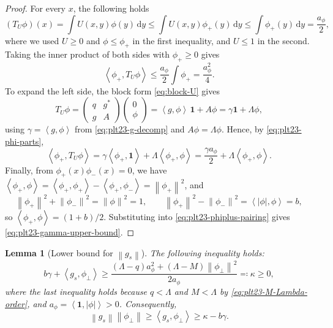 ﻿\documentclass[11pt]{article}
\newtheorem{lemma}[theorem]{Lemma}
\numberwithin{equation}{section}
\newcommand{\one}{\mathbf 1}
\newcommand{\ip}[2]{\left\langle #1,#2\right\rangle}
\newcommand{\norm}[1]{\left\lVert #1\right\rVert}
\newcommand{\dd}{\,\mathrm d}
\begin{document}
\begin{proof}
  For every $x$, the following holds
  \[
    (T_U \phi)(x) = \int U(x, y) \phi(y) \dd y \le \int U(x, y) \phi_+(y) \dd y \le \int \phi_+(y) \dd y = \frac{a_\phi}{2},
  \]
  where we used $U \ge 0$ and $\phi \le \phi_+$ in the first inequality, and $U \le 1$ in the second.
  Taking the inner product of both sides with $\phi_+\ge0$ gives
  \begin{equation}\label{eq:plt23-phiplus-pairing}
    \ip{\phi_+}{T_U\phi}
    \le\frac{a_\phi}{2}\int\phi_+
    =\frac{a_\phi^2}{4}.
  \end{equation}
  To expand the left side, the block form \eqref{eq:block-U} gives
  \[
    T_U\phi=\begin{pmatrix}
      q & g^* \\
      g & A
    \end{pmatrix} \begin{pmatrix}
      0 \\ \phi
    \end{pmatrix}=\ip g\phi\,\one+A\phi=\gamma\one+\Lambda\phi,
  \]
  using $\gamma=\ip g\phi$ from \eqref{eq:plt23-g-decomp} and $A\phi=\Lambda\phi$.
  Hence, by \eqref{eq:plt23-phi-parts},
  \[
    \ip{\phi_+}{T_U\phi}
    =\gamma\ip{\phi_+}\one+\Lambda\ip{\phi_+}\phi
    =\frac{\gamma a_\phi}{2}+\Lambda\ip{\phi_+}\phi.
  \]
  Finally, from $\phi_+(x) \phi_-(x) = 0$, we have $\ip{\phi_+}\phi=\ip{\phi_+}{\phi_+} - \ip{\phi_+}{\phi_-} = \norm{\phi_+}^2$, and
  \[
    \norm{\phi_+}^2+\norm{\phi_-}^2=\norm\phi^2=1,
    \qquad
    \norm{\phi_+}^2-\norm{\phi_-}^2=\ip{|\phi|}\phi=b,
  \]
  so $\ip{\phi_+}\phi=(1+b)/2$.
  Substituting into \eqref{eq:plt23-phiplus-pairing} gives \eqref{eq:plt23-gamma-upper-bound}.
\end{proof}

\begin{lemma}[Lower bound for $\norm{g_s}$]\label{lem:plt23-gs-lower-bound}
  The following inequality holds:
  \begin{equation}\label{eq:plt23-gs-inner-lower}
    b\gamma+\ip{g_s}{\phi_\perp}
    \ge\frac{(\Lambda-q)a_\phi^2+(\Lambda-M)\norm{\phi_\perp}^2}{2a_\phi}
    \eqqcolon\kappa\ge0,
  \end{equation}
  where the last inequality holds because $q<\Lambda$ and $M<\Lambda$ by \eqref{eq:plt23-M-Lambda-order}, and $a_\phi=\ip\one{|\phi|}>0$.
  Consequently,
  \begin{equation}\label{eq:plt23-gs-norm-lower}
    \norm{g_s}\norm{\phi_\perp}\ge \ip{g_s}{\phi_\perp}\ge\kappa-b\gamma.
  \end{equation}
\end{lemma}
\end{document}
